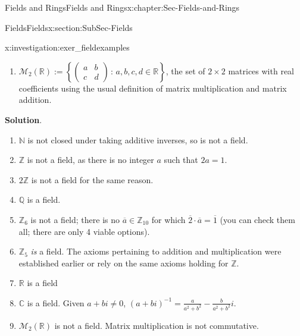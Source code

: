 \documentclass[oneside,10pt,]{book}
\newcommand{\blocktitlefont}{\relax}
\numberwithin{equation}{section}
\newcommand{\setof}[2]{{\left\{#1\,\colon\,#2\right\}}}
\def\C{{\mathbb C}}
\def\Z{{\mathbb Z}}
\def\Q{{\mathbb Q}}
\def\N{{\mathbb N}}
\def\R{{\mathbb R}}
\newcommand{\amp}{&}
\begin{document}
\begin{chapterptx}{Fields and Rings}{}{Fields and Rings}{}{}{x:chapter:Sec-Fields-and-Rings}
\begin{sectionptx}{Fields}{}{Fields}{}{}{x:section:SubSec-Fields}
\begin{investigation}{}{x:investigation:exer_fieldexamples}
\begin{enumerate}
\item{}\(\mathcal{M}_2(\R) := \setof{\left(\begin{matrix}a \amp b \\ c \amp d \end{matrix} \right)}{a,b,c,d\in\R}\)\footnotemark{}, the set of \(2\times 2\) matrices with real coefficients using the usual definition of matrix multiplication\footnotemark{} and matrix addition.%
\end{enumerate}
%
\par\smallskip%
\noindent\textbf{\blocktitlefont Solution}.\hypertarget{g:solution:idm484913829248}{}\quad{}%
\begin{enumerate}
\item{}\(\N\) is not closed under taking additive inverses, so is not a field.%
\item{}\(\Z\) is not a field, as there is no integer \(a\) such that \(2a = 1\).%
\item{}\(2\Z\) is not a field for the same reason.%
\item{}\(\Q\) is a field.%
\item{}\(\Z_{6}\) is not a field; there is no \(\overline{a}\in \Z_{10}\) for which \(\overline{2}\cdot \overline{a} = \overline{1}\) (you can check them all; there are only 4 viable options).%
\item{}\(\Z_{5}\) \emph{is} a field. The axioms pertaining to addition and multiplication were established earlier or rely on the same axioms holding for \(\Z\).%
\item{}\(\R\) is a field%
\item{}\(\C\) is a field. Given \(a+bi\ne 0\), \((a+bi)^{-1} = \frac{a}{a^2 + b^2} - \frac{b}{a^2 + b^2} i\).%
\item{}\(\mathcal{M}_2(\R)\) is not a field. Matrix multiplication is not commutative.%
\end{enumerate}
%
\end{investigation}
%

\end{sectionptx}
\end{chapterptx}
\end{document}
